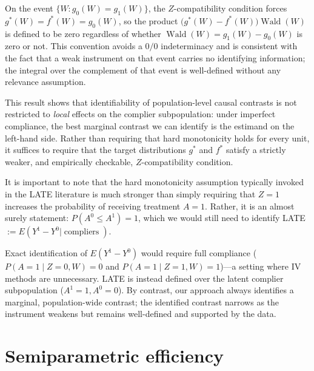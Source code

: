\documentclass[12pt]{article}
\theoremstyle{thmstyleone}%
\theoremstyle{thmstyletwo}%
\theoremstyle{thmstylethree}%
\begin{document}
 {On the event $\{W : g_0(W)=g_1(W)\}$, the $Z$-compatibility condition forces $g^*(W)=f^*(W)=g_0(W)$, so the product $\bigl(g^*(W)-f^*(W)\bigr)\operatorname{Wald}(W)$ is defined to be zero regardless of whether $\operatorname{Wald}(W)=g_1(W)-g_0(W)$ is zero or not. This convention avoids a $0/0$ indeterminacy and is consistent with the fact that a weak instrument on that event carries no identifying information; the integral over the complement of that event is well-defined without any relevance assumption.}

 {This result shows that identifiability of population-level causal contrasts is not restricted to \emph{local} effects on the complier subpopulation: under imperfect compliance, the best marginal contrast we can identify is the estimand on the left-hand side. Rather than requiring that hard monotonicity holds for every unit, it suffices to require that the target distributions $g^*$ and $f^*$ satisfy a strictly weaker, and empirically checkable, $Z$-compatibility condition.}


It is important to note that the hard monotonicity assumption typically invoked in the LATE literature is much stronger than simply requiring that \( Z = 1 \) increases the probability of receiving treatment \( A = 1 \). Rather, it is an almost surely statement: \(  {P}(A^{0} \leq A^{1}) = 1 \), which we would still need to identify LATE$:=E(Y^1-Y^0|\operatorname{compliers})$. 

Exact identification of $E(Y^1-Y^0)$ would require full compliance ($P(A=1\mid Z=0,W)=0$ and $P(A=1\mid Z=1,W)=1$)---a setting where IV methods are unnecessary. LATE is instead defined over the latent complier subpopulation ($A^1=1, A^0=0$). By contrast, our approach always identifies a marginal, population-wide contrast; the identified contrast narrows as the instrument weakens but remains well-defined and supported by the data.




\section{Semiparametric efficiency}\label{sec:semi}
\end{document}
